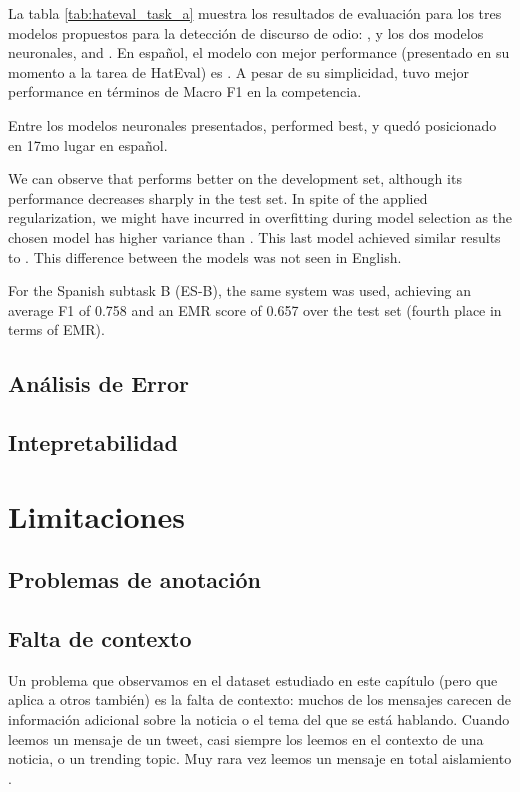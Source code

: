 La tabla \ref{tab:hateval_task_a} muestra los resultados de evaluación para los tres modelos propuestos para la detección de discurso de odio:  \svmmodel{}, y los dos modelos neuronales, \elmomodel{} and \elmobowmodel{}. En español, el modelo con mejor performance (presentado en su momento a la tarea de HatEval\citet{hateval2019semeval}) es \svmmodel{}.
A pesar de su simplicidad, tuvo mejor performance en términos de Macro F1 en la competencia.



Entre los modelos neuronales presentados, \elmobowmodel{} performed best, y quedó posicionado en 17mo lugar en español.


We can observe that \elmobowmodel{} performs better on the development set, although its performance decreases sharply in the test set. In spite of the applied regularization, we might have incurred in overfitting during model selection \cite{cawley2010over} as the chosen model has higher variance than \elmomodel{}. This last model achieved similar results to \svmmodel{}. This difference between the models was not seen in English.

For the Spanish subtask B (ES-B), the same \svmmodel{} system was used, achieving an average F1 of 0.758 and an EMR score of 0.657 over the test set (fourth place in terms of EMR).

\subsection{Análisis de Error}

\subsection{Intepretabilidad}

\section{Limitaciones}

\subsection{Problemas de anotación}

\subsection{Falta de contexto}

Un problema que observamos en el dataset estudiado en este capítulo (pero que aplica a otros también) es la falta de contexto: muchos de los mensajes carecen de información adicional sobre la noticia o el tema del que se está hablando. Cuando leemos un mensaje de un tweet, casi siempre los leemos en el contexto de una noticia, o un trending topic. Muy rara vez leemos un mensaje en total aislamiento .

